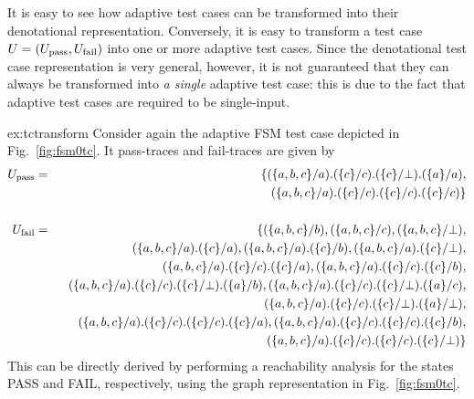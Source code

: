 It is easy to see how adaptive test cases can be transformed into their denotational representation. Conversely, it is easy to transform a test case $U = ({U}_\text{pass},{U}_\text{fail})$
into one or more adaptive test cases. Since the denotational test case representation
is very general, however, it is not guaranteed that they can always be transformed into {\it a single} adaptive test case: this is due to the fact that adaptive test cases
are required to be single-input.
\begin{example}{ex:tctransform}
Consider again the adaptive FSM test case depicted in Fig.~\ref{fig:fsm0tc}.
It pass-traces and fail-traces are given by
\begin{eqnarray*}
\xpass U & =  & \{ (\{a,b,c\}/a).(\{c\}/c).(\{c\}/\bot).(\{a\}/a),
\\ & & \ \ (\{a,b,c\}/a).(\{c\}/c).(\{c\}/c).(\{c\}/c)
\}
\\ & & {~} \\
\xfail U & = & \{ (\{a,b,c\}/b), (\{a,b,c\}/c), (\{a,b,c\}/\bot),
\\ & & \ \ (\{a,b,c\}/a).(\{c\}/a), (\{a,b,c\}/a).(\{c\}/b), (\{a,b,c\}/a).(\{c\}/\bot),
\\ & & \ \ (\{a,b,c\}/a).(\{c\}/c).(\{c\}/a), (\{a,b,c\}/a).(\{c\}/c).(\{c\}/b),
\\ & & \ \ (\{a,b,c\}/a).(\{c\}/c).(\{c\}/\bot).(\{a\}/b),
(\{a,b,c\}/a).(\{c\}/c).(\{c\}/\bot).(\{a\}/c),
\\ & & \ \ 
(\{a,b,c\}/a).(\{c\}/c).(\{c\}/\bot).(\{a\}/\bot),
\\ & & \ \ (\{a,b,c\}/a).(\{c\}/c).(\{c\}/c).(\{c\}/a),
(\{a,b,c\}/a).(\{c\}/c).(\{c\}/c).(\{c\}/b),
\\ & & \ \ 
(\{a,b,c\}/a).(\{c\}/c).(\{c\}/c).(\{c\}/\bot)
\}
\end{eqnarray*}
This can be directly derived by performing a reachability analysis for the states PASS and FAIL, respectively, using the graph representation in Fig.~\ref{fig:fsm0tc}.
\end{example}



